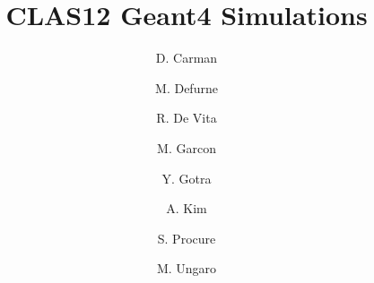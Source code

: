 \title{CLAS12 Geant4 Simulations}



\author[C]{D. Carman}
\author[C]{M. Defurne}
\author[B]{R. De Vita}
\author[C]{M. Garcon}
\author[A]{Y. Gotra}
\author[D]{A. Kim}
\author[C]{S. Procure}
\author[A]{M. Ungaro}

\address[A]{Thomas Jefferson National Accelerator Facility, Newport News, VA, USA}
\address[B]{Istituto Nazionale Di Fisica Nucleare, Genova, Italy}
\address[C]{IRFU, CEA, Universit\`e Paris-Saclay, F-91191 Gif-sur-Yvette, France}
\address[D]{University of Connecticut, Storrs, Connecticut}
